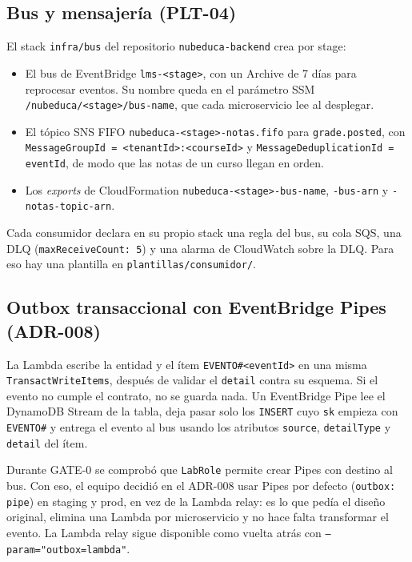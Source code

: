 \subsection{Bus y mensajería (PLT-04)}
El stack \texttt{infra/bus} del repositorio \texttt{nubeduca-backend} crea por stage:
\begin{itemize}
  \item El bus de EventBridge \texttt{lms-<stage>}, con un Archive de 7 días para reprocesar eventos.
        Su nombre queda en el parámetro SSM \texttt{/nubeduca/<stage>/bus-name}, que cada microservicio
        lee al desplegar.
  \item El tópico SNS FIFO \texttt{nubeduca-<stage>-notas.fifo} para \texttt{grade.posted}, con
        \texttt{MessageGroupId = <tenantId>:<courseId>} y \texttt{MessageDeduplicationId = eventId}, de
        modo que las notas de un curso llegan en orden.
  \item Los \textit{exports} de CloudFormation \texttt{nubeduca-<stage>-bus-name}, \texttt{-bus-arn} y
        \texttt{-notas-topic-arn}.
\end{itemize}
Cada consumidor declara en su propio stack una regla del bus, su cola SQS, una DLQ
(\texttt{maxReceiveCount: 5}) y una alarma de CloudWatch sobre la DLQ. Para eso hay una plantilla en
\texttt{plantillas/consumidor/}.

\subsection{Outbox transaccional con EventBridge Pipes (ADR-008)}
La Lambda escribe la entidad y el ítem \texttt{EVENTO\#<eventId>} en una misma
\texttt{TransactWriteItems}, después de validar el \texttt{detail} contra su esquema. Si el evento no
cumple el contrato, no se guarda nada. Un EventBridge Pipe lee el DynamoDB Stream de la tabla, deja
pasar solo los \texttt{INSERT} cuyo \texttt{sk} empieza con \texttt{EVENTO\#} y entrega el evento al
bus usando los atributos \texttt{source}, \texttt{detailType} y \texttt{detail} del ítem.

Durante GATE-0 se comprobó que \texttt{LabRole} permite crear Pipes con destino al bus. Con eso, el
equipo decidió en el ADR-008 usar Pipes por defecto (\texttt{outbox: pipe}) en staging y prod, en vez
de la Lambda relay: es lo que pedía el diseño original, elimina una Lambda por microservicio y no hace
falta transformar el evento. La Lambda relay sigue disponible como vuelta atrás con
\texttt{--param="outbox=lambda"}.

